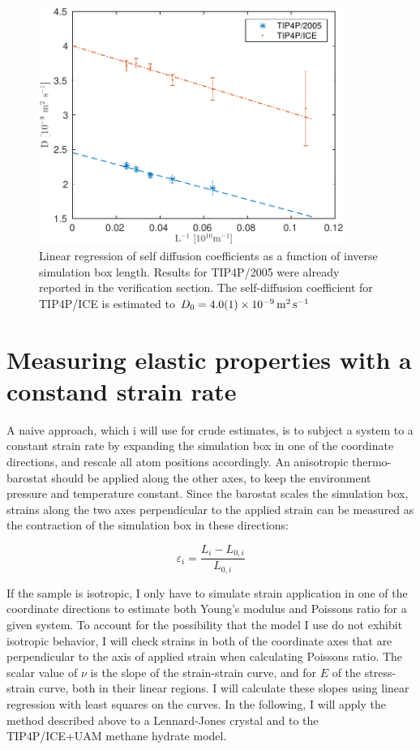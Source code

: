 \begin{figure}
\centering
\includegraphics[width=10cm]{../figures/thesis/diffusivity_comparison_tip4p_ice_2005.pdf}
\caption{Linear regression of self diffusion coefficients as a function of inverse simulation box length. Results for TIP4P/2005 were already reported in the verification section. The self-diffusion coefficient for TIP4P/ICE is estimated to $D_0 = \SI{4.0 \pm 0.1 d-9}{\meter\squared\per\second}$}
\label{fig:diffusivity_comparison_tip4p_ice_2005}
\end{figure}

\section{Measuring elastic properties with a constand strain rate}
A naive approach, which i will use for crude estimates, is to subject a system to a constant strain rate by expanding the simulation box in one of the coordinate directions, and rescale all atom positions accordingly. An anisotropic thermo-barostat should be applied along the other axes, to keep the environment pressure and temperature constant. Since the barostat scales the simulation box, strains along the two axes perpendicular to the applied strain can be measured as the contraction of the simulation box in these directions:

\begin{equation}
\varepsilon_i = \frac{L_i-L_{0, i}}{L_{0, i}}
\end{equation}

If the sample is isotropic, I only have to simulate strain application in one of the coordinate directions to estimate both Young's modulus and Poissons ratio for a given system. To account for the possibility that the model I use do not exhibit isotropic behavior, I will check strains in both of the coordinate axes that are perpendicular to the axis of applied strain when calculating Poissons ratio. The scalar value of $\nu$ is the slope of the strain-strain curve, and for $E$ of the stress-strain curve, both in their linear regions. I will calculate these slopes using linear regression with least squares on the curves.
In the following, I will apply the method described above to a Lennard-Jones crystal and to the TIP4P/ICE+UAM methane hydrate model.

